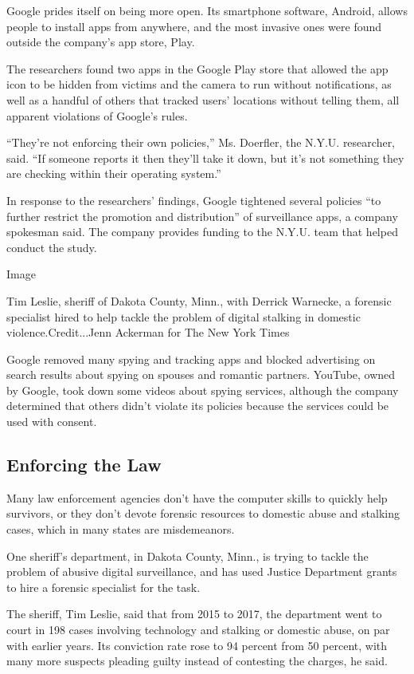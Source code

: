 Google prides itself on being more open. Its smartphone software,
Android, allows people to install apps from anywhere, and the most
invasive ones were found outside the company's app store, Play.

The researchers found two apps in the Google Play store that allowed the
app icon to be hidden from victims and the camera to run without
notifications, as well as a handful of others that tracked users'
locations without telling them, all apparent violations of Google's
rules.

``They're not enforcing their own policies,'' Ms. Doerfler, the N.Y.U.
researcher, said. ``If someone reports it then they'll take it down, but
it's not something they are checking within their operating system.''

In response to the researchers' findings, Google tightened several
policies ``to further restrict the promotion and distribution'' of
surveillance apps, a company spokesman said. The company provides
funding to the N.Y.U. team that helped conduct the study.

Image

Tim Leslie, sheriff of Dakota County, Minn., with Derrick Warnecke, a
forensic specialist hired to help tackle the problem of digital stalking
in domestic violence.Credit...Jenn Ackerman for The New York Times

Google removed many spying and tracking apps and blocked advertising on
search results about spying on spouses and romantic partners. YouTube,
owned by Google, took down some videos about spying services, although
the company determined that others didn't violate its policies because
the services could be used with consent.

\hypertarget{enforcing-the-law}{%
\subsection{Enforcing the Law}\label{enforcing-the-law}}

Many law enforcement agencies don't have the computer skills to quickly
help survivors, or they don't devote forensic resources to domestic
abuse and stalking cases, which in many states are misdemeanors.

One sheriff's department, in Dakota County, Minn., is trying to tackle
the problem of abusive digital surveillance, and has used Justice
Department grants to hire a forensic specialist for the task.

The sheriff, Tim Leslie, said that from 2015 to 2017, the department
went to court in 198 cases involving technology and stalking or domestic
abuse, on par with earlier years. Its conviction rate rose to 94 percent
from 50 percent, with many more suspects pleading guilty instead of
contesting the charges, he said.


